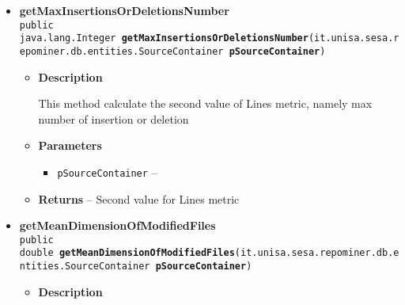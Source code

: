 {{{{{{{\begin{itemize}
{\begin{itemize}
{This method calculate the Lines metric. The Lines metric represent the total, mean an maximum number of insertion or deletion
}
\item{
{\bf  Parameters}
  \begin{itemize}
   \item{
\texttt{pSourceContainer} -- }
  \end{itemize}
}%
\item{{\bf  Returns} -- 
Lines metric value 
}%
\end{itemize}
}%
\item{ 
\hypertarget{it.unisa.sesa.repominer.metrics.PackageMetrics.getMaxInsertionsOrDeletionsNumber(it.unisa.sesa.repominer.db.entities.SourceContainer)}{{\bf  getMaxInsertionsOrDeletionsNumber}\\}
\texttt{public java.lang.Integer\ {\bf  getMaxInsertionsOrDeletionsNumber}(\texttt{it.unisa.sesa.repominer.db.entities.SourceContainer} {\bf  pSourceContainer})
\label{it.unisa.sesa.repominer.metrics.PackageMetrics.getMaxInsertionsOrDeletionsNumber(it.unisa.sesa.repominer.db.entities.SourceContainer)}}%
\begin{itemize}
\item{
{\bf  Description}

This method calculate the second value of Lines metric, namely max number of insertion or deletion
}
\item{
{\bf  Parameters}
  \begin{itemize}
   \item{
\texttt{pSourceContainer} -- }
  \end{itemize}
}%
\item{{\bf  Returns} -- 
Second value for Lines metric 
}%
\end{itemize}
}%
\item{ 
\hypertarget{it.unisa.sesa.repominer.metrics.PackageMetrics.getMeanDimensionOfModifiedFiles(it.unisa.sesa.repominer.db.entities.SourceContainer)}{{\bf  getMeanDimensionOfModifiedFiles}\\}
\texttt{public double\ {\bf  getMeanDimensionOfModifiedFiles}(\texttt{it.unisa.sesa.repominer.db.entities.SourceContainer} {\bf  pSourceContainer})
\label{it.unisa.sesa.repominer.metrics.PackageMetrics.getMeanDimensionOfModifiedFiles(it.unisa.sesa.repominer.db.entities.SourceContainer)}}%
\begin{itemize}
\item{
{\bf  Description}

}
\end{itemize}}
\end{itemize}}}}}}}}
